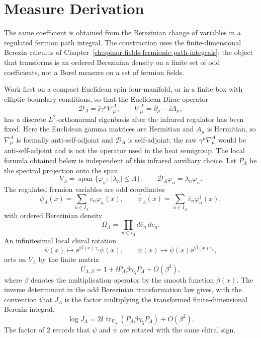 \section{Measure Derivation}

The same coefficient is obtained from the Berezinian change of variables in a
regulated fermion path integral.  The construction uses the finite-dimensional
Berezin calculus of Chapter~\ref{ch:spinor-fields-fermionic-path-integrals};
the object that transforms is an ordered Berezinian density on a finite set of
odd coefficients, not a Borel measure on a set of fermion fields.

Work first on a compact Euclidean spin four-manifold, or in a finite box with
elliptic boundary conditions, so that the Euclidean Dirac operator
\[
  \mathcal D_A
  =
  \ii\gamma^\mu\nabla_\mu^A,
  \qquad
  \nabla_\mu^A=\partial_\mu-\ii A_\mu,
\]
has a discrete \(L^2\)-orthonormal eigenbasis after the infrared regulator has
been fixed.  Here the Euclidean gamma matrices are Hermitian and \(A_\mu\) is
Hermitian, so \(\nabla_\mu^A\) is formally anti-self-adjoint and
\(\mathcal D_A\) is self-adjoint; the raw \(\gamma^\mu\nabla_\mu^A\) would be
anti-self-adjoint and is not the operator used in the heat semigroup.  The
local formula obtained below is independent of this infrared auxiliary
choice.  Let \(P_\Lambda\) be the spectral projection onto
the span
\[
  V_\Lambda
  =
  \operatorname{span}\{\varphi_n:\ |\lambda_n|\le \Lambda\},
  \qquad
  \mathcal D_A\varphi_n=\lambda_n\varphi_n .
\]
The regulated fermion variables are odd coordinates
\[
  \psi_\Lambda(x)=\sum_{n\in I_\Lambda} c_n\varphi_n(x),
  \qquad
  \bar\psi_\Lambda(x)=\sum_{n\in I_\Lambda}\bar c_n\varphi_n^\dagger(x),
\]
with ordered Berezinian density
\[
  \Omega_\Lambda
  =
  \prod_{n\in I_\Lambda} d\bar c_n\,dc_n .
\]
An infinitesimal local chiral rotation
\[
  \psi(x)\mapsto \ee^{\ii\beta(x)\gamma_5}\psi(x),
  \qquad
  \bar\psi(x)\mapsto \bar\psi(x)\ee^{\ii\beta(x)\gamma_5},
\]
acts on \(V_\Lambda\) by the finite matrix
\[
  U_{\Lambda,\beta}
  =
  1+\ii P_\Lambda\beta\gamma_5P_\Lambda+O(\beta^2),
\]
where \(\beta\) denotes the multiplication operator by the smooth function
\(\beta(x)\).  The inverse determinant in the odd Berezinian transformation
law gives, with the convention that \(J_\Lambda\) is the factor multiplying
the transformed finite-dimensional Berezin integral,
\[
  \log J_\Lambda
  =
  2\ii\,
  \operatorname{tr}_{V_\Lambda}
  (P_\Lambda\beta\gamma_5P_\Lambda)
  +O(\beta^2).
\]
The factor of \(2\) records that \(\psi\) and \(\bar\psi\) are rotated with
the same chiral sign.

